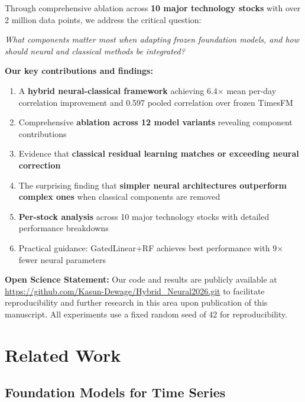 \documentclass[10pt,conference]{IEEEtran}
\newcommand{\rev}[1]{#1}
\begin{document}
Through comprehensive ablation across \textbf{10 major technology stocks} with over 2 million data points, we address the critical question:

\begin{center}
\textit{What components matter most when adapting frozen foundation models, and how should neural and classical methods be integrated?}
\end{center}

\textbf{Our key contributions and findings:}

\begin{enumerate}
    \item A \textbf{hybrid neural-classical framework} achieving \rev{6.4$\times$ mean per-day correlation improvement and 0.597 pooled correlation} over frozen TimesFM
    \item Comprehensive \textbf{ablation across 12 model variants} revealing component contributions
    \item Evidence that \textbf{classical residual learning \rev{matches or exceeding neural correction}} 
    \item The surprising finding that \textbf{simpler neural architectures outperform complex ones} when classical components are removed
    \item \textbf{Per-stock analysis} across 10 major technology stocks with detailed performance breakdowns
    \item Practical guidance: GatedLinear+RF achieves best performance with 9$\times$ fewer neural parameters
\end{enumerate}

\noindent\textbf{Open Science Statement:} Our code and results  are publicly available at \url{https://github.com/Kasun-Dewage/Hybrid_Neural2026.git} to facilitate reproducibility and further research in this area upon publication of this manuscript. All experiments use a fixed random seed of 42 for reproducibility.

\section{Related Work}

\subsection{Foundation Models for Time Series}
\end{document}
